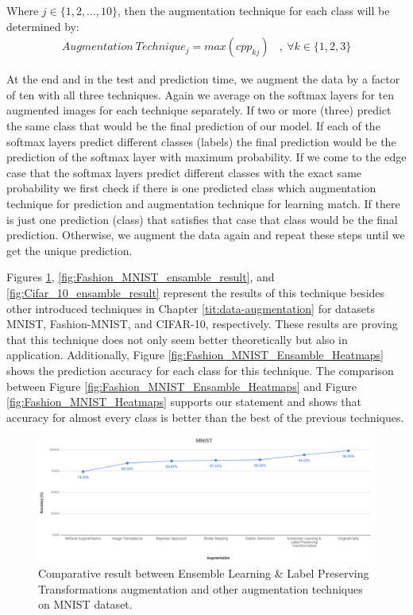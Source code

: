 Where $j \in \{1,2,...,10\}$, then the augmentation technique for each class will be determined by:
\begin{equation}
  \begin{aligned}
    Augmentation \ Technique_{j} = max(cpp_{kj}) \ \ \ \ , \ \forall k \in \{1,2,3\}
  \end{aligned}
\end{equation}

At the end and in the test and prediction time, we augment the data by a factor of ten with all three
techniques. Again we average on the softmax layers for ten augmented
images for each technique separately. If two or more (three) predict the same class that would be the
final prediction of our model. If each of the softmax layers predict different classes (labels) the
final prediction would be the prediction of the softmax layer with maximum probability.  If we come
to the edge case that the softmax layers predict different classes with the exact same probability
we first check if there is one predicted class which augmentation technique for prediction and
augmentation technique for learning match. If there is just one prediction (class) that satisfies
that case that class would be the final prediction. Otherwise, we augment the data again and repeat
these steps until we get the unique prediction.

Figures \ref{fig:MNIST_ensamble_result}, \ref{fig:Fashion_MNIST_ensamble_result}, and \ref{fig:Cifar_10_ensamble_result} represent the results of this technique besides other introduced techniques in
Chapter \ref{tit:data-augmentation} for datasets MNIST, Fashion-MNIST, and CIFAR-10, respectively. These results are
proving that this technique does not only seem better theoretically but
also in application. Additionally, Figure \ref{fig:Fashion_MNIST_Ensamble_Heatmaps} shows the
prediction accuracy for each class for this technique. The comparison between Figure \ref{fig:Fashion_MNIST_Ensamble_Heatmaps} and Figure
\ref{fig:Fashion_MNIST_Heatmaps} supports our statement and shows that accuracy for almost every class is better than the best of the previous techniques.

\begin{figure}
  \centering
  \label{fig:MNIST_ensamble_result}
  \includegraphics[width=1\textwidth]{fig/contribution/mnist-ensamble-result}
  \caption{Comparative result between Ensemble Learning \& Label Preserving Transformations augmentation and other augmentation techniques on MNIST dataset.}
\end{figure}


